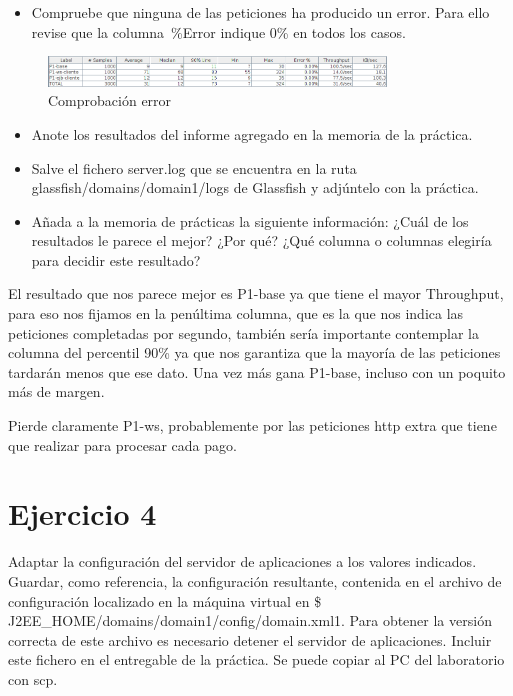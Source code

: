 \documentclass[a4paper, 10pt]{article}
\begin{document}
\begin{mdframed} 
\begin{itemize}
\item Compruebe que ninguna de las peticiones ha producido un error. Para ello revise que la 
columna \,\%Error indique 0\% en todos los casos. 
\end{itemize} 
\end{mdframed}
\begin{figure}[hbtp]
	 	\centering
	 	\includegraphics[width=0.8\textwidth]{../../p2/pantallazos/ej3_report.png}
	 	\caption{Comprobación error}
\end{figure}
\begin{mdframed}
\begin{itemize}
Una vez que los resultados han sido satisfactorios: 
\item Anote los resultados del informe agregado en la memoria de la práctica. 
\item Salve el fichero server.log que se encuentra en la ruta glassfish/domains/domain1/logs de 
Glassfish y adjúntelo con la práctica. 
\item Añada a la memoria de prácticas la siguiente información: ¿Cuál de los resultados le parece el 
mejor? ¿Por qué? ¿Qué columna o columnas elegiría para decidir este resultado? 
\end{itemize} 
\end{mdframed} 
El resultado que nos parece mejor es P1-base ya que tiene el mayor Throughput, para eso nos fijamos en la penúltima columna, que es la que nos indica las peticiones completadas por segundo, también sería importante contemplar la columna del percentil 90\% ya que nos garantiza que la mayoría de las peticiones tardarán menos que ese dato. Una vez más gana P1-base, incluso con un poquito más de margen.

Pierde claramente P1-ws, probablemente por las peticiones http extra que tiene que realizar para procesar cada pago.


\section{Ejercicio 4}
\begin{mdframed} 
Adaptar la configuración del servidor de aplicaciones a los valores indicados. Guardar, como 
referencia, la configuración resultante, contenida en el archivo de configuración localizado en la máquina virtual en \$ J2EE\_HOME/domains/domain1/config/domain.xml1. Para obtener la versión correcta de este archivo es necesario detener el servidor de aplicaciones. Incluir este fichero en el entregable de la práctica. Se puede copiar al PC del laboratorio con scp. 
\end{mdframed}
\end{document}
